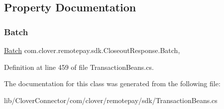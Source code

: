 \subsection{Property Documentation}
\mbox{\label{classcom_1_1clover_1_1remotepay_1_1sdk_1_1_closeout_response_a738d2647e57079c997ca44d5ac5317e1}} 
\subsubsection{\texorpdfstring{Batch}{Batch}}
{\footnotesize\ttfamily \hyperlink{classcom_1_1clover_1_1sdk_1_1v3_1_1payments_1_1_batch}{Batch} com.\+clover.\+remotepay.\+sdk.\+Closeout\+Response.\+Batch\hspace{0.3cm}{\ttfamily [get]}, {\ttfamily [set]}}



Definition at line 459 of file Transaction\+Beans.\+cs.



The documentation for this class was generated from the following file\+:\begin{DoxyCompactItemize}
\item 
lib/\+Clover\+Connector/com/clover/remotepay/sdk/Transaction\+Beans.\+cs\end{DoxyCompactItemize}

